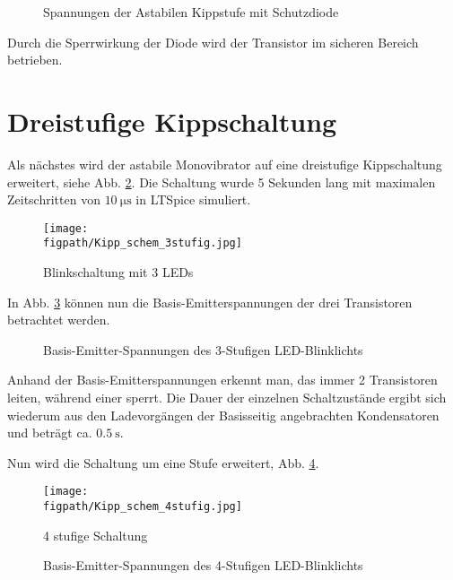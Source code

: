\begin{figure}[H]
	\centering \small
	\scalebox{0.9}{}
	\caption{Spannungen der Astabilen Kippstufe mit Schutzdiode}
	\label{fig_Kap3_09:Spannungen}
\end{figure}

Durch die Sperrwirkung der Diode wird der Transistor im sicheren Bereich betrieben.

\section{Dreistufige Kippschaltung}
Als nächstes wird der astabile Monovibrator auf eine dreistufige Kippschaltung erweitert, siehe Abb. \ref{fig_Kap3_10:3stufig}. Die Schaltung wurde 5 Sekunden lang mit maximalen Zeitschritten von $\SI{10}{\micro\second}$ in LTSpice simuliert.

\begin{figure}[H]
    \centering
    \texttt{[image: \\figpath/Kipp\_schem\_3stufig.jpg]}
    \caption{Blinkschaltung mit 3 LEDs}
    \label{fig_Kap3_10:3stufig}
\end{figure}

In Abb. \ref{fig_Kap3_11:Spannungen} können nun die Basis-Emitterspannungen der drei Transistoren betrachtet werden.

\begin{figure}[H]
	\centering \small
	\scalebox{0.9}{}
	\caption{Basis-Emitter-Spannungen des 3-Stufigen LED-Blinklichts}
	\label{fig_Kap3_11:Spannungen}
\end{figure}

Anhand der Basis-Emitterspannungen erkennt man, das immer 2 Transistoren leiten, während einer sperrt. Die Dauer der einzelnen Schaltzustände ergibt sich wiederum aus den Ladevorgängen der Basisseitig angebrachten Kondensatoren und beträgt ca. $\SI{0,5}{\second}$.

Nun wird die Schaltung um eine Stufe erweitert, Abb. \ref{fig_Kap3_12:4stufig}.

\begin{figure}[H]
    \centering
    \texttt{[image: \\figpath/Kipp\_schem\_4stufig.jpg]}
    \caption{4 stufige Schaltung}
    \label{fig_Kap3_12:4stufig}
\end{figure}

\begin{figure}[H]
	\centering \small
	\scalebox{0.9}{}
	\caption{Basis-Emitter-Spannungen des 4-Stufigen LED-Blinklichts}
	\label{fig_Kap3_13:Spannungen}
\end{figure}

